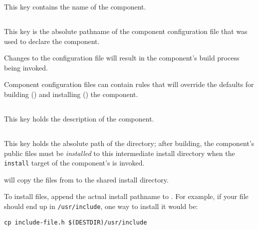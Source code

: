 This key contains the name of the component.


\subsection{}\label{variables:configuration-file}

This key is the absolute pathname of the component configuration file
that was used to declare the component.

Changes to the configuration file will result in the component's build
process being invoked.

Component configuration files can contain \makefile rules that will
override the defaults for building
() and installing
() the component.


\subsection{}\label{variables:description}

This key holds the description of the component.


\subsection{}\label{variables:destdir-directory}

This key holds the absolute path of the \destdir directory; after
building, the component's public files must be \emph{installed} to this
intermediate install directory when the \texttt{install} target of the
component's \makefile is invoked.

\lmsbw will copy the files from \destdir to the shared install directory.

To install files, append the actual install pathname to \destdir.  For
example, if your file should end up in \texttt{/usr/include}, one way
to install it would be:

\begin{verbatim}
cp include-file.h $(DESTDIR)/usr/include
\end{verbatim}

